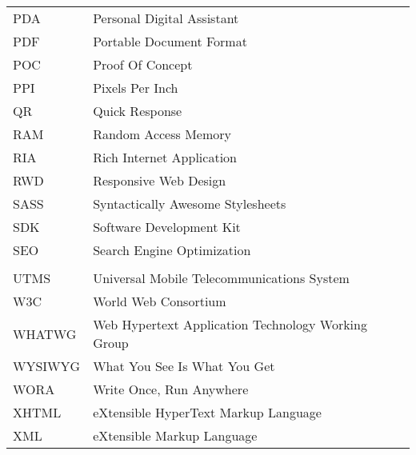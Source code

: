 \documentclass[master=cws,dutch,masteroption={vs,gs},inputenc=utf8]{kulemt}
\begin{document}
\begin{flushleft}
\begin{longtable}{p{2cm} l}
     PDA & Personal Digital Assistant \\
     PDF & Portable Document Format \\
     POC & Proof Of Concept \\
     PPI & Pixels Per Inch \\
     QR & Quick Response \\
     RAM & Random Access Memory \\
     RIA & Rich Internet Application \\
     RWD & Responsive Web Design \\
     SASS & Syntactically Awesome Stylesheets \\
     SDK & Software Development Kit \\
     SEO & Search Engine Optimization \\
     \sta{} & \st{} \\
     UTMS & Universal Mobile Telecommunications System \\
     W3C & World Web Consortium \\
     WHATWG & Web Hypertext Application Technology Working Group \\
     WYSIWYG & What You See Is What You Get \\
     WORA & Write Once, Run Anywhere \\
     XHTML & eXtensible HyperText Markup Language \\ 
     XML & eXtensible Markup Language
  \end{longtable}
\end{flushleft}

\mainmatter














       
\appendix



\backmatter


\end{document}

